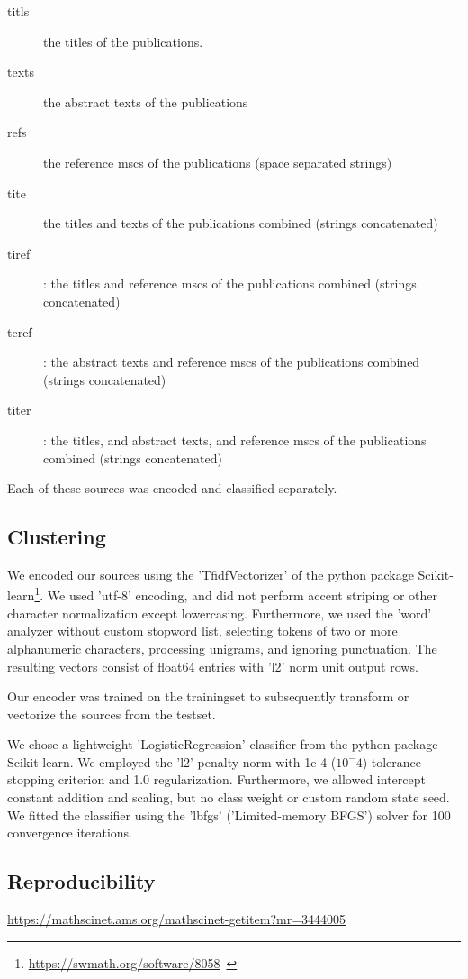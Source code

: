\begin{description}
  \item[titls] the titles of the publications.
  \item[texts] the abstract texts of the publications
  \item[refs] the reference mscs of the publications (space separated strings)
  \item[tite] the titles and texts of the publications combined (strings concatenated)
  \item[tiref]: the titles and reference mscs of the publications combined (strings concatenated)
  \item[teref]: the abstract texts and reference mscs of the publications combined (strings concatenated)
  \item[titer]: the titles, and abstract texts, and reference mscs of the publications combined (strings concatenated)
\end{description}





Each of these sources was encoded and classified separately.
\subsection{Clustering}

We encoded our sources using the 'TfidfVectorizer' of the python package Scikit-learn\footnote{\url{https://swmath.org/software/8058}~\cite{swSciKit}}. We used 'utf-8' encoding, and did not perform accent striping or other character normalization except lowercasing. Furthermore, we used the 'word' analyzer without custom stopword list, selecting tokens of two or more alphanumeric characters, processing unigrams, and ignoring punctuation. The resulting vectors consist of float64 entries with 'l2' norm unit output rows.



Our encoder was trained on the trainingset to subsequently transform or vectorize the sources from the testset.

We chose a lightweight 'LogisticRegression' classifier from the python package Scikit-learn. We employed the 'l2' penalty norm with 1e-4 ($10^-4$) tolerance stopping criterion and 1.0 regularization. Furthermore, we allowed intercept constant addition and scaling, but no class weight or custom random state seed. We fitted the classifier using the 'lbfgs' ('Limited-memory BFGS') solver for 100 convergence iterations.
\subsection{Reproducibility}
\url{https://mathscinet.ams.org/mathscinet-getitem?mr=3444005}

